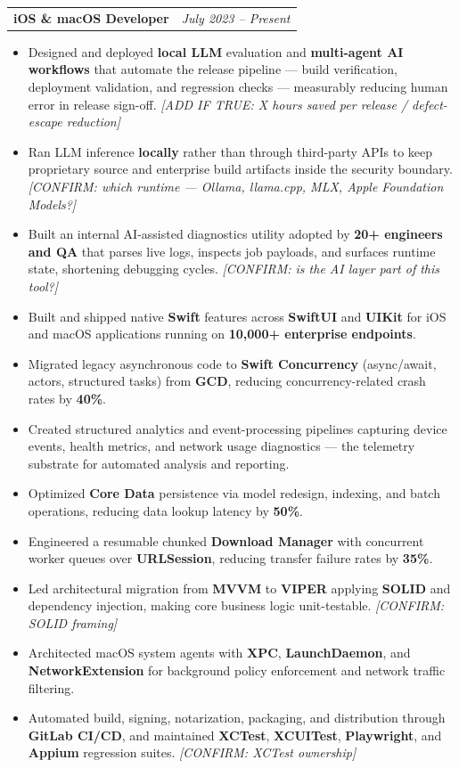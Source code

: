 \documentclass[letterpaper,11pt]{article}
\makeatletter
\newcommand{\resumeItem}[1]{\item\small{{#1 \vspace{-2pt}}}}
\newcommand{\resumeRole}[2]{
    \item
    \begin{tabular*}{0.97\textwidth}{l@{\extracolsep{\fill}}r}
      \textbf{\small#1} & \textit{\small #2} \\
    \end{tabular*}\vspace{-7pt}
}
\newcommand{\resumeItemListStart}{\begin{itemize}}
\newcommand{\resumeItemListEnd}{\end{itemize}\vspace{-5pt}}
\makeatother
\begin{document}
        \resumeRole{iOS \& macOS Developer}{July 2023 -- Present}
            \resumeItemListStart
                \resumeItem{Designed and deployed \textbf{local LLM} evaluation and \textbf{multi-agent AI workflows} that automate the release pipeline — build verification, deployment validation, and regression checks — measurably reducing human error in release sign-off. \textit{[ADD IF TRUE: X hours saved per release / defect-escape reduction]}}
                \resumeItem{Ran LLM inference \textbf{locally} rather than through third-party APIs to keep proprietary source and enterprise build artifacts inside the security boundary. \textit{[CONFIRM: which runtime — Ollama, llama.cpp, MLX, Apple Foundation Models?]}}
                \resumeItem{Built an internal AI-assisted diagnostics utility adopted by \textbf{20+ engineers and QA} that parses live logs, inspects job payloads, and surfaces runtime state, shortening debugging cycles. \textit{[CONFIRM: is the AI layer part of this tool?]}}
                \resumeItem{Built and shipped native \textbf{Swift} features across \textbf{SwiftUI} and \textbf{UIKit} for iOS and macOS applications running on \textbf{10,000+ enterprise endpoints}.}
                \resumeItem{Migrated legacy asynchronous code to \textbf{Swift Concurrency} (async/await, actors, structured tasks) from \textbf{GCD}, reducing concurrency-related crash rates by \textbf{40\%}.}
                \resumeItem{Created structured analytics and event-processing pipelines capturing device events, health metrics, and network usage diagnostics — the telemetry substrate for automated analysis and reporting.}
                \resumeItem{Optimized \textbf{Core Data} persistence via model redesign, indexing, and batch operations, reducing data lookup latency by \textbf{50\%}.}
                \resumeItem{Engineered a resumable chunked \textbf{Download Manager} with concurrent worker queues over \textbf{URLSession}, reducing transfer failure rates by \textbf{35\%}.}
                \resumeItem{Led architectural migration from \textbf{MVVM} to \textbf{VIPER} applying \textbf{SOLID} and dependency injection, making core business logic unit-testable. \textit{[CONFIRM: SOLID framing]}}
                \resumeItem{Architected macOS system agents with \textbf{XPC}, \textbf{LaunchDaemon}, and \textbf{NetworkExtension} for background policy enforcement and network traffic filtering.}
                \resumeItem{Automated build, signing, notarization, packaging, and distribution through \textbf{GitLab CI/CD}, and maintained \textbf{XCTest}, \textbf{XCUITest}, \textbf{Playwright}, and \textbf{Appium} regression suites. \textit{[CONFIRM: XCTest ownership]}}
            \resumeItemListEnd
\end{document}
